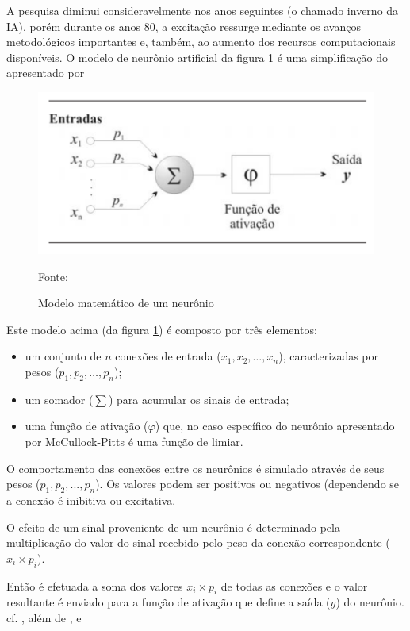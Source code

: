 A pesquisa diminui consideravelmente nos anos seguintes (o chamado inverno da IA), porém durante  os  anos  80,  a excitação	ressurge mediante os avanços metodológicos importantes e, também, ao aumento dos recursos computacionais disponíveis. O  modelo  de  neurônio  artificial  da figura \ref{fig:neuronio} é uma
simplificação do apresentado por \cite[p. 36]{haykin_redes_2001}

\begin{figure}[h!]
	\centering
	\includegraphics[width=.7\textwidth]{imagens/modelo_matematico_neuronio.png}
	
	{\scriptsize 	Fonte: \cite[p. 36]{haykin_redes_2001}}
	\caption{Modelo matemático de um neurônio}
	\label{fig:neuronio}
\end{figure}

Este modelo acima (da figura \ref{fig:neuronio}) é composto por três elementos:

\begin{itemize}
	\item  um conjunto de $ n $ conexões de entrada ($ x_1, x_2, \dots , x_n $), caracterizadas por pesos ($ p_1, p_2, \dots, p_n $);
	\item um somador ($ \sum $) para acumular os sinais de entrada;
	\item uma função de ativação ($\varphi$) que, no caso específico do neurônio apresentado por McCullock-Pitts \cite{mcculloch_logical_1943} é uma função de limiar. \cite{ferneda_redes_2006} \cite{lima_ia_2016}
\end{itemize}

O comportamento das conexões entre os neurônios é simulado através de seus pesos  ($ p_1, p_2, ..., p_n $). Os valores podem ser positivos ou negativos (dependendo se a conexão é inibitiva ou excitativa. 

O efeito de um sinal proveniente de um neurônio é determinado pela multiplicação do valor do sinal recebido pelo peso da conexão correspondente ($x_i \times p_i$).

Então é efetuada a soma dos valores $x_i \times p_i$ de todas as conexões e o valor resultante é enviado para a função de ativação que define a saída ($y$) do neurônio. cf. \cite{Norvig2013} \cite{mcculloch_logical_1943}, além de \cite{minsky_perceptrons:_1969}, \cite{ferneda_redes_2006} e \cite{haykin_redes_2001}

